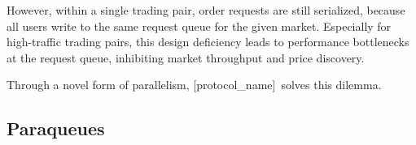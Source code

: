 \documentclass{scrartcl}
\def\theName{[protocol\_name]}
\begin{document}
However, within a single trading pair, order requests are still serialized, because all users write to the same request queue for the given market.
Especially for high-traffic trading pairs, this design deficiency leads to performance bottlenecks at the request queue, inhibiting market throughput and price discovery.

Through a novel form of parallelism, \theName\ solves this dilemma.

\subsection{Paraqueues}

\begin{center}
\end{center}
\end{document}
